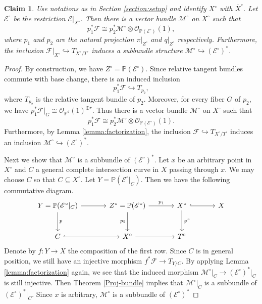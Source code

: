 \documentclass[english,reqno]{amsart}
\newcommand\bbP{{\mathbb P}}
\newcommand\sE{{\mathscr E}}
\newcommand\sF{{\mathscr F}}
\newcommand\sM{{\mathscr M}}
\newcommand\sO{{\mathscr O}}
\theoremstyle{plain}
\newtheorem{claim}[thm]{Claim}
\theoremstyle{definition}
\numberwithin{equation}{section} %
\begin{document}
\label{section:step-1-case-2}

\begin{claim}\label{claim:pullback-saturated-subsheaf}
	Use notations as in Section \ref{section:setup} and identify $X^\circ$ with $\overline{X}^\circ$. Let $\sE^\circ$ be the restriction $\sE\vert_{X^\circ}$. Then there is a vector bundle $\sM^\circ$ on $X^\circ$  such that 
	$$
	p_1^*\sF \cong p_2^*\sM^\circ \otimes \sO_{\mathbb{P}(\sE^\circ)}(1),
	$$ 
	where $p_1$ and $p_2$ are the natural projection $\pi\vert_{Z^\circ}$ and $q\vert_{Z^\circ}$ respectively. Furthermore, the inclusion $\sF|_{X^\circ} \hookrightarrow T_{X^\circ/T^\circ}$ induces a subbundle structure $\sM^\circ \hookrightarrow  (\sE^\circ)^*$.
\end{claim}


\begin{proof}
	By construction, we have $Z^\circ=\bbP(\sE^\circ)$. Since relative tangent bundles commute  with base change, there is an induced  inclusion $$p_1^*\sF \hookrightarrow  T_{p_2},$$ where   $T_{p_2}$ is the relative tangent bundle of $p_2$.
	Moreover, for every fiber $G$ of $p_2$, we have $p_1^*\sF|_{G} \cong \sO_{\bbP^d}(1)^{\oplus r}$.
	Thus there is a vector bundle $\sM^\circ$ on $X^\circ$  such that 
	$$
	p_1^*\sF \cong p_2^*\sM^\circ \otimes \sO_{\mathbb{P}(\sE^\circ)}(1).
	$$
	Furthermore,  by Lemma \ref{lemma:factorization}, the inclusion $\sF \hookrightarrow T_{X^\circ/T^\circ}$ induces an inclusion $\sM^\circ \hookrightarrow (\sE^\circ)^*$.
	
	Next we show that $\sM^\circ$ is a subbundle of $(\sE^\circ)^*$. Let $x$ be an arbitrary point in $X^\circ$ and   $C$  a  general complete intersection curve in $X$ passing through $x$.
	We may choose $C$ so that $C\subseteq X^\circ$. Let  $Y = \bbP(\sE^\circ\vert_C)$.
	Then we have the following commutative diagram.
	\[\begin{tikzcd}[column sep=large, row sep=large]
	Y=\bbP(\sE^\circ\vert_C) \dar{p}   \rar      &    Z^\circ=\bbP(\sE^\circ)\rar{p_1}\dar[swap]{p_2}  &  X^\circ\dar{\varphi^\circ}  \arrow[r,hookrightarrow] & X\\
	C  \arrow[r,hookrightarrow]   &    X^\circ  \rar   & T^\circ &
	\end{tikzcd}
	\]
	Denote by $f \colon Y\to X$ the composition of the first row.
	Since $C$ is in general position, we still have an injective morphism $f^*\sF \to T_{Y/C}$.
	By applying Lemma \ref{lemma:factorization} again, we see that the induced morphism $\sM^\circ|_C \to (\sE^\circ)^*\vert_C$  is still injective. Then Theorem \ref{Proj-bundle}  implies that $\sM^\circ|_C$ is a subbundle of $(\sE^\circ)^*\vert_C$. Since $x$ is arbitrary, $\sM^\circ$ is a subbundle of $(\sE^\circ)^*$
\end{proof}
\end{document}
